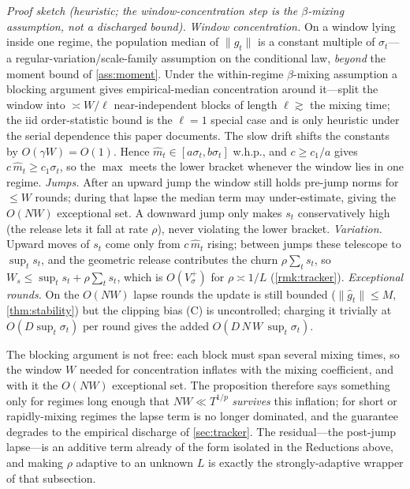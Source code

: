 \documentclass{article}
\newcommand{\norm}[1]{\lVert #1 \rVert}
\newcommand{\gt}{g_t}
\begin{document}
\medskip\noindent\textit{Proof sketch (heuristic; the window-concentration step is the
$\beta$-mixing assumption, not a discharged bound).}
\emph{Window concentration.} On a window lying inside one regime, the population median
of $\norm{\gt}$ is a constant multiple of $\sigma_t$---a regular-variation/scale-family
assumption on the conditional law, \emph{beyond} the moment bound of \cref{ass:moment}. Under the
within-regime $\beta$-mixing assumption a blocking argument gives empirical-median
concentration around it---split the window into $\asymp W/\ell$ near-independent blocks of
length $\ell\gtrsim$ the mixing time; the iid order-statistic bound is the $\ell{=}1$
special case and is only heuristic under the serial dependence this paper documents. The
slow drift shifts the constants by $O(\gamma W)=O(1)$. Hence
$\widehat m_t\in[a\sigma_t,b\sigma_t]$ w.h.p., and $c\ge c_1/a$ gives
$c\,\widehat m_t\ge c_1\sigma_t$, so the $\max$ meets the lower bracket whenever the
window lies in one regime.
\emph{Jumps.} After an upward jump the window still holds pre-jump norms for $\le W$
rounds; during that lapse the median term may under-estimate, giving the $O(NW)$
exceptional set. A downward jump only makes $s_t$ conservatively high (the release lets
it fall at rate $\rho$), never violating the lower bracket.
\emph{Variation.} Upward moves of $s_t$ come only from $c\,\widehat m_t$ rising; between
jumps these telescope to $\sup_t s_t$, and the geometric release contributes the churn
$\rho\sum_t s_t$, so $W_s\le\sup_t s_t+\rho\sum_t s_t$, which is $O(V_\sigma^+)$ for
$\rho\asymp1/L$ (\cref{rmk:tracker}).
\emph{Exceptional rounds.} On the $O(NW)$ lapse rounds the update is still bounded
($\norm{\hat g_t}\le M$, \cref{thm:stability}) but the clipping bias (C) is uncontrolled;
charging it trivially at $O(D\sup_t\sigma_t)$ per round gives the added
$O(D\,N\,W\,\sup_t\sigma_t)$.\medskip

The blocking argument is not free: each block must span several mixing times, so the window
$W$ needed for concentration inflates with the mixing coefficient, and with it the $O(NW)$
exceptional set. The proposition therefore says something only for regimes long enough that
$NW\ll T^{1/p}$ \emph{survives} this inflation; for short or rapidly-mixing regimes the lapse
term is no longer dominated, and the guarantee degrades to the empirical discharge of
\cref{sec:tracker}. The residual---the post-jump lapse---is an additive term already of the form isolated in
the Reductions above, and making $\rho$ adaptive to an unknown $L$ is exactly the
strongly-adaptive wrapper of that subsection.
\end{document}

